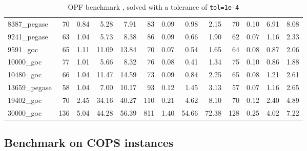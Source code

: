 \begin{table}[!ht]
{\begin{tabular}{|l|rrrr|rrrr|rrrr|}
			8387\_pegase & 70 & 0.84 & 5.28 & 7.91 & 83 & 0.09 & 0.98 & 2.15 & 70 & 0.10 & 6.91 & 8.08 \\
			9241\_pegase & 63 & 1.04 & 5.73 & 8.38 & 86 & 0.09 & 0.66 & 1.90 & 62 & 0.07 & 1.16 & 2.33 \\
			9591\_goc & 65 & 1.11 & 11.09 & 13.84 & 70 & 0.07 & 0.54 & 1.65 & 64 & 0.08 & 0.87 & 2.06 \\
			10000\_goc & 77 & 1.01 & 5.66 & 8.32 & 76 & 0.08 & 0.41 & 1.34 & 75 & 0.10 & 0.86 & 1.88 \\
			\hline
			10480\_goc & 66 & 1.04 & 11.47 & 14.59 & 73 & 0.09 & 0.84 & 2.25 & 65 & 0.08 & 1.21 & 2.61 \\
			13659\_pegase & 58 & 1.04 & 7.00 & 10.17 & 93 & 0.12 & 1.45 & 3.13 & 57 & 0.07 & 1.16 & 2.65 \\
			19402\_goc & 70 & 2.45 & 34.16 & 40.27 & 110 & 0.21 & 4.62 & 8.10 & 70 & 0.12 & 2.40 & 4.89 \\
			30000\_goc & 136 & 5.04 & 44.28 & 56.39 & 811 & 1.40 & 54.66 & 72.38 & 128 & 0.25 & 4.02 & 7.22 \\
			\hline
		\end{tabular}
  }
  \caption{OPF benchmark \label{tab:opf:benchmark}, solved with a tolerance of {\tt tol=1e-4}}
\end{table}


\subsection{Benchmark on COPS instances}

